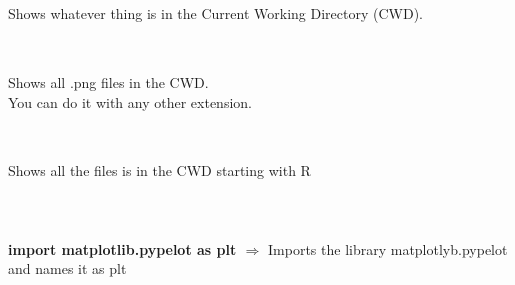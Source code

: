\documentclass[a4paper,18pt]{article}
\begin{document}

\subsection{\colorbox {matgreen}{\color{white}{\large glob.glob('*')}}}
Shows whatever thing is in the Current Working Directory (CWD).\\\\


\subsection{\colorbox {matgreen}{\color{white}{\large glob.glob('*.png')}}}
Shows all .png files in the CWD.\\ 
You can do it with any other extension.\\\\


\subsection{\colorbox {matgreen}{\color{white}{\large glob.glob('R*')}}}
Shows all the files is in the CWD starting with R\\\\

\section{\colorbox {Abi}{}}

\subsection{\colorbox {matgreen}{\color{white}{\large import matplotlib.pypelot as plt}}}
\textbf{import matplotlib.pypelot as plt $\Rightarrow$} Imports the library matplotlyb.pypelot and names it as plt\\\\
\end{document}
